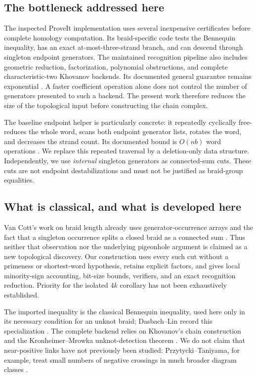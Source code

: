 \documentclass[11pt,letterpaper]{article}
\theoremstyle{definition}
\begin{document}
\subsection{The bottleneck addressed here}
The inspected ProveIt implementation uses several inexpensive certificates before complete homology computation. Its braid-specific code tests the Bennequin inequality, has an exact at-most-three-strand branch, and can descend through singleton endpoint generators. The maintained recognition pipeline also includes geometric reduction, factorization, polynomial obstructions, and complete characteristic-two Khovanov backends. Its documented general guarantee remains exponential \cite{proveit,braidsource}. A faster coefficient operation alone does not control the number of generators presented to such a backend. The present work therefore reduces the size of the topological input before constructing the chain complex.

The baseline endpoint helper is particularly concrete: it repeatedly cyclically free-reduces the whole word, scans both endpoint generator lists, rotates the word, and decreases the strand count. Its documented bound is $O(nb)$ word operations \cite{endpointsource}. We replace this repeated traversal by a deletion-only data structure. Independently, we use \emph{internal} singleton generators as connected-sum cuts. These cuts are not endpoint destabilizations and must not be justified as braid-group equalities.

\subsection{What is classical, and what is developed here}
Van Cott's work on braid length already uses generator-occurrence arrays and the fact that a singleton occurrence splits a closed braid as a connected sum \cite[proof of Theorem 5]{vancott}. Thus neither that observation nor the underlying pigeonhole argument is claimed as a new topological discovery. Our construction uses every such cut without a primeness or shortest-word hypothesis, retains explicit factors, and gives local minority-sign accounting, bit-size bounds, verifiers, and an exact recognition reduction. Priority for the isolated $4k$ corollary has not been exhaustively established.

The imported inequality is the classical Bennequin inequality, used here only in its necessary condition for an unknot braid; Dasbach--Lin record this specialization \cite{dasbachlin}. The complete backend relies on Khovanov's chain construction and the Kronheimer--Mrowka unknot-detection theorem \cite{khovanov,km}. We do not claim that near-positive links have not previously been studied: Przytycki--Taniyama, for example, treat small numbers of negative crossings in much broader diagram classes \cite{przytycki}.
\end{document}
